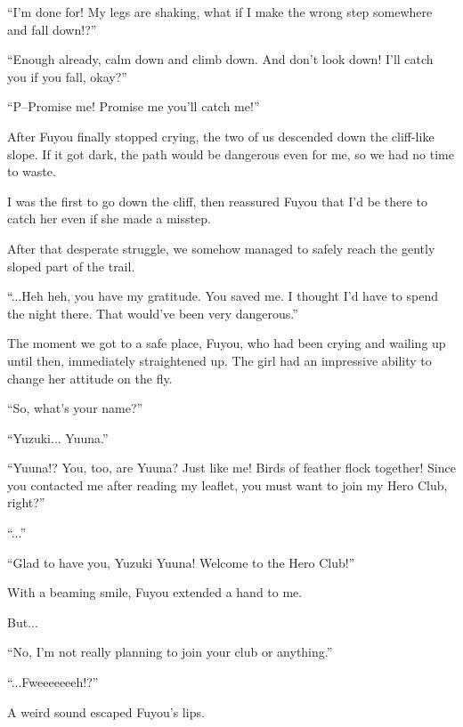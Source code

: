 ``I'm done for! My legs are shaking, what if I make the wrong step somewhere and fall down!?''

``Enough already, calm down and climb down. And don't look down! I'll catch you if you fall, okay?''

``P--Promise me! Promise me you'll catch me!''

After Fuyou finally stopped crying, the two of us descended down the cliff-like slope. If it got dark, the path would be dangerous even for me, so we had no time to waste.

I was the first to go down the cliff, then reassured Fuyou that I'd be there to catch her even if she made a misstep.

After that desperate struggle, we somehow managed to safely reach the gently sloped part of the trail.

``...Heh heh, you have my gratitude. You saved me. I thought I'd have to spend the night there. That would've been very dangerous.''

The moment we got to a safe place, Fuyou, who had been crying and wailing up until then, immediately straightened up. The girl had an impressive ability to change her attitude on the fly.

``So, what's your name?''

``Yuzuki... Yuuna.''

``Yuuna!? You, too, are Yuuna? Just like me! Birds of feather flock together! Since you contacted me after reading my leaflet, you must want to join my Hero Club, right?''

``...''

``Glad to have you, Yuzuki Yuuna! Welcome to the Hero Club!''

With a beaming smile, Fuyou extended a hand to me.

But...

``No, I'm not really planning to join your club or anything.''

``...Fweeeeeeeh!?''

A weird sound escaped Fuyou's lips.

